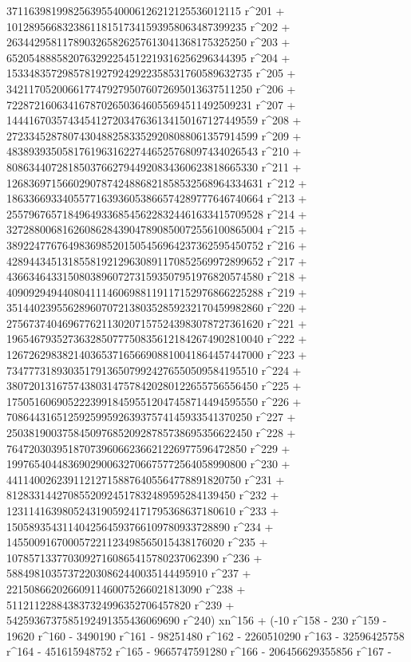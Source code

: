        371163981998256395540006126212125536012115 r^201 + 
       1012895668323861181517341593958063487399235 r^202 + 
       2634429581178903265826257613041368175325250 r^203 + 
       6520548885820763292254512219316256296344395 r^204 + 
       15334835729857819279242922358531760589632735 r^205 + 
       34211705200661774792795076072695013637511250 r^206 + 
       72287216063416787026503646055694511492509231 r^207 + 
       144416703574345412720347636134150167127449559 r^208 + 
       272334528780743048825833529208088061357914599 r^209 + 
       483893935058176196316227446525768097434026543 r^210 + 
       808634407281850376627944920834360623818665330 r^211 + 
       1268369715660290787424886821858532568964334631 r^212 + 
       1863366933405577163936053866574289777646740664 r^213 + 
       2557967657184964933685456228324461633415709528 r^214 + 
       3272880068162608628439047890850072556100865004 r^215 + 
       3892247767649836985201505456964237362595450752 r^216 + 
       4289443451318558192129630891170852569972899652 r^217 + 
       4366346433150803896072731593507951976820574580 r^218 + 
       4090929494408041114606988119117152976866225288 r^219 + 
       3514402395562896070721380352859232170459982860 r^220 + 
       2756737404696776211302071575243983078727361620 r^221 + 
       1965467935273632850777508356121842674902810040 r^222 + 
       1267262983821403653716566908810041864457447000 r^223 + 
       734777318930351791365079924276550509584195510 r^224 + 
       380720131675743803147578420280122655756556450 r^225 + 
       175051606905222399184595512047458714494595550 r^226 + 
       70864431651259259959263937574145933541370250 r^227 + 
       25038190037584509768520928785738695356622450 r^228 + 
       7647203039518707396066236621226977596472850 r^229 + 
       1997654044836902900632706675772564058990800 r^230 + 
       441140026239112127158876405564778891820750 r^231 + 
       81283314427085520924517832489595284139450 r^232 + 
       12311416398052431905924171795368637180610 r^233 + 
       1505893543114042564593766109780933728890 r^234 + 
       145500916700057221123498565015438176020 r^235 + 
       10785713377030927160865415780237062390 r^236 + 
       588498103573722030862440035144495910 r^237 + 
       22150866202660911460075266021813090 r^238 + 
       511211228843837324996352706457820 r^239 + 
       5425936737585192491355436069690 r^240) xn^156 + (-10 r^158 - 
       230 r^159 - 19620 r^160 - 3490190 r^161 - 98251480 r^162 - 
       2260510290 r^163 - 32596425758 r^164 - 451615948752 r^165 - 
       9665747591280 r^166 - 206456629355856 r^167 - 
